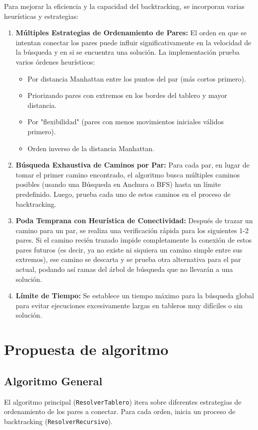\documentclass[spanish]{article}
\numberwithin{equation}{section}
\numberwithin{figure}{section}
\theoremstyle{definition}
\begin{document}
Para mejorar la eficiencia y la capacidad del backtracking, se incorporan varias heurísticas y estrategias:
\begin{enumerate}
    \item \textbf{Múltiples Estrategias de Ordenamiento de Pares:} El orden en que se intentan conectar los pares puede influir significativamente en la velocidad de la búsqueda y en si se encuentra una solución. La implementación prueba varios órdenes heurísticos:
    \begin{itemize}
        \item Por distancia Manhattan entre los puntos del par (más cortos primero).
        \item Priorizando pares con extremos en los bordes del tablero y mayor distancia.
        \item Por "flexibilidad" (pares con menos movimientos iniciales válidos primero).
        \item Orden inverso de la distancia Manhattan.
    \end{itemize}
    \item \textbf{Búsqueda Exhaustiva de Caminos por Par:} Para cada par, en lugar de tomar el primer camino encontrado, el algoritmo busca múltiples caminos posibles (usando una Búsqueda en Anchura o BFS) hasta un límite predefinido. Luego, prueba cada uno de estos caminos en el proceso de backtracking.
    \item \textbf{Poda Temprana con Heurística de Conectividad:} Después de trazar un camino para un par, se realiza una verificación rápida para los siguientes 1-2 pares. Si el camino recién trazado impide completamente la conexión de estos pares futuros (es decir, ya no existe ni siquiera un camino simple entre sus extremos), ese camino se descarta y se prueba otra alternativa para el par actual, podando así ramas del árbol de búsqueda que no llevarán a una solución.
    \item \textbf{Límite de Tiempo:} Se establece un tiempo máximo para la búsqueda global para evitar ejecuciones excesivamente largas en tableros muy difíciles o sin solución.
\end{enumerate}

\section{Propuesta de algoritmo}

\subsection{Algoritmo General}
El algoritmo principal (\texttt{ResolverTablero}) itera sobre diferentes estrategias de ordenamiento de los pares a conectar. Para cada orden, inicia un proceso de backtracking (\texttt{ResolverRecursivo}).
\end{document}
